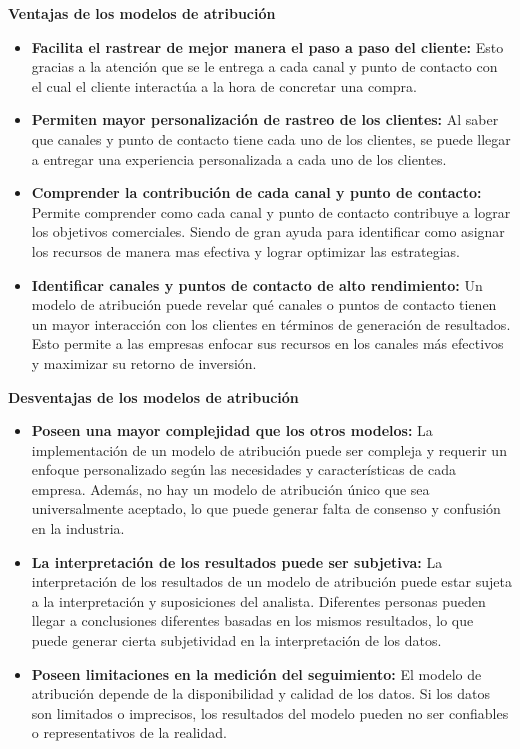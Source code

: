 \textbf{Ventajas de los modelos de atribución}

\begin{itemize}
\item \textbf{Facilita el rastrear de mejor manera el paso a paso del cliente:} Esto gracias a la atención que se le entrega a cada canal y punto de contacto con el cual el cliente interactúa a la hora de concretar una compra.
\item \textbf{Permiten mayor personalización de rastreo de los clientes:} Al saber que canales y punto de contacto tiene cada uno de los clientes, se puede llegar a entregar una experiencia personalizada a cada uno de los clientes.
\item \textbf{Comprender la contribución de cada canal y punto de contacto:} Permite comprender como cada canal y punto de contacto contribuye a lograr los objetivos comerciales. Siendo de gran ayuda para identificar como asignar los recursos de manera mas efectiva y lograr optimizar las estrategias.
\item \textbf{Identificar canales y puntos de contacto de alto rendimiento:} Un modelo de atribución puede revelar qué canales o puntos de contacto tienen un mayor interacción con los clientes en términos de generación de resultados. Esto permite a las empresas enfocar sus recursos en los canales más efectivos y maximizar su retorno de inversión.
\end{itemize}

\textbf{Desventajas de los modelos de atribución}

\begin{itemize}
\item \textbf{Poseen una mayor complejidad que los otros modelos:} La implementación de un modelo de atribución puede ser compleja y requerir un enfoque personalizado según las necesidades y características de cada empresa. Además, no hay un modelo de atribución único que sea universalmente aceptado, lo que puede generar falta de consenso y confusión en la industria.
\item \textbf{La interpretación de los resultados puede ser subjetiva:} La interpretación de los resultados de un modelo de atribución puede estar sujeta a la interpretación y suposiciones del analista. Diferentes personas pueden llegar a conclusiones diferentes basadas en los mismos resultados, lo que puede generar cierta subjetividad en la interpretación de los datos.
\item \textbf{Poseen limitaciones en la medición del seguimiento:} El modelo de atribución depende de la disponibilidad y calidad de los datos. Si los datos son limitados o imprecisos, los resultados del modelo pueden no ser confiables o representativos de la realidad.
\end{itemize}